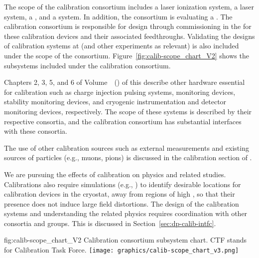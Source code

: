 The scope of the calibration consortium includes a laser ionization system, a \phel laser system, a , and a  system. In addition, the consortium is evaluating a . The calibration consortium is responsible for design through commissioning in the  for these calibration devices and their associated feedthroughs. Validating the designs of calibration systems at  (and other experiments as relevant) is also included under the scope of the consortium. Figure~\ref{fig:calib-scope_chart_V2} shows the subsystems included under the calibration consortium. 

Chapters 2, 3, 5, and 6 of Volume~\volnumberdp~(\voltitledp) of this  describe other hardware essential for calibration such as  charge injection pulsing systems,  monitoring devices,  stability monitoring devices, and cryogenic instrumentation and detector monitoring devices, respectively. The scope of these systems is described by their respective consortia, and the calibration consortium has substantial interfaces with these consortia. 

The use of other calibration sources such as external measurements and existing sources of particles (e.g., muons, pions) is discussed in the calibration section of  \physchtools. 

We are pursuing the effects of calibration on physics and related studies. %
Calibrations also require simulations (e.g., \efield) to identify desirable locations for calibration devices in the cryostat, away from regions of high \efield, so that their presence does not induce large field distortions. 
The design of the calibration systems and understanding the related physics requires coordination with other consortia and groups. This is discussed in Section~\ref{sec:dp-calib-intfc}.

\begin{dunefigure}{fig:calib-scope_chart_V2}
{Calibration consortium subsystem chart. CTF stands for Calibration Task Force.}
\texttt{[image: graphics/calib-scope\_chart\_v3.png]}
\end{dunefigure}

